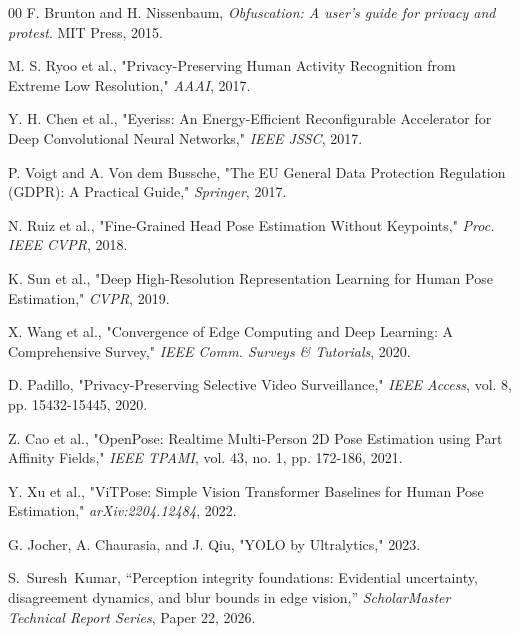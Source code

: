 \documentclass[conference]{IEEEtran}
\begin{document}
\begin{thebibliography}{00}
 F. Brunton and H. Nissenbaum, \textit{Obfuscation: A user's guide for privacy and protest}. MIT Press, 2015.

 M. S. Ryoo et al., "Privacy-Preserving Human Activity Recognition from Extreme Low Resolution," \textit{AAAI}, 2017.

 Y. H. Chen et al., "Eyeriss: An Energy-Efficient Reconfigurable Accelerator for Deep Convolutional Neural Networks," \textit{IEEE JSSC}, 2017.

 P. Voigt and A. Von dem Bussche, "The EU General Data Protection Regulation (GDPR): A Practical Guide," \textit{Springer}, 2017.

 N. Ruiz et al., "Fine-Grained Head Pose Estimation Without Keypoints," \textit{Proc. IEEE CVPR}, 2018.

 K. Sun et al., "Deep High-Resolution Representation Learning for Human Pose Estimation," \textit{CVPR}, 2019.

 X. Wang et al., "Convergence of Edge Computing and Deep Learning: A Comprehensive Survey," \textit{IEEE Comm. Surveys \& Tutorials}, 2020.

 D. Padillo, "Privacy-Preserving Selective Video Surveillance," \textit{IEEE Access}, vol. 8, pp. 15432-15445, 2020.

 Z. Cao et al., "OpenPose: Realtime Multi-Person 2D Pose Estimation using Part Affinity Fields," \textit{IEEE TPAMI}, vol. 43, no. 1, pp. 172-186, 2021.

 Y. Xu et al., "ViTPose: Simple Vision Transformer Baselines for Human Pose Estimation," \textit{arXiv:2204.12484}, 2022.

 G. Jocher, A. Chaurasia, and J. Qiu, "YOLO by Ultralytics," 2023.

 S.~Suresh~Kumar, ``Perception integrity foundations: Evidential uncertainty, disagreement dynamics, and blur bounds in edge vision,'' \emph{ScholarMaster Technical Report Series}, Paper 22, 2026.
\end{thebibliography}
\end{document}
